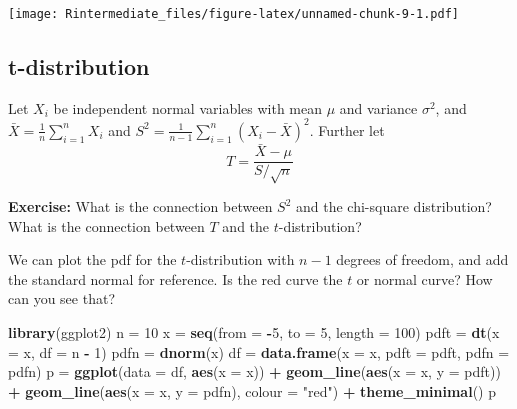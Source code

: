 \documentclass[]{article}
\newenvironment{Shaded}{\begin{snugshade}}{\end{snugshade}}
\newcommand{\KeywordTok}[1]{\textcolor[rgb]{0.13,0.29,0.53}{\textbf{#1}}}
\newcommand{\DataTypeTok}[1]{\textcolor[rgb]{0.13,0.29,0.53}{#1}}
\newcommand{\DecValTok}[1]{\textcolor[rgb]{0.00,0.00,0.81}{#1}}
\newcommand{\StringTok}[1]{\textcolor[rgb]{0.31,0.60,0.02}{#1}}
\newcommand{\OperatorTok}[1]{\textcolor[rgb]{0.81,0.36,0.00}{\textbf{#1}}}
\newcommand{\NormalTok}[1]{#1}
\begin{document}
\texttt{[image: Rintermediate\_files/figure-latex/unnamed-chunk-9-1.pdf]}

\subsection{t-distribution}\label{t-distribution}

Let \(X_i\) be independent normal variables with mean \(\mu\) and
variance \(\sigma^2\), and \(\bar{X}=\frac{1}{n}\sum_{i=1}^n X_i\) and
\(S^2=\frac{1}{n-1}\sum_{i=1}^n (X_i-\bar{X})^2\). Further let
\[ T=\frac{\bar{X}-\mu}{S/\sqrt{n}}\]

\textbf{Exercise:} What is the connection between \(S^2\) and the
chi-square distribution? What is the connection between \(T\) and the
\(t\)-distribution?

\begingroup\color{dg}

\endgroup

We can plot the pdf for the \(t\)-distribution with \(n-1\) degrees of
freedom, and add the standard normal for reference. Is the red curve the
\(t\) or normal curve? How can you see that?

\begin{Shaded}
\begin{Highlighting}[]
\KeywordTok{library}\NormalTok{(ggplot2)}
\NormalTok{n =}\StringTok{ }\DecValTok{10}
\NormalTok{x =}\StringTok{ }\KeywordTok{seq}\NormalTok{(}\DataTypeTok{from =} \OperatorTok{-}\DecValTok{5}\NormalTok{, }\DataTypeTok{to =} \DecValTok{5}\NormalTok{, }\DataTypeTok{length =} \DecValTok{100}\NormalTok{)}
\NormalTok{pdft =}\StringTok{ }\KeywordTok{dt}\NormalTok{(}\DataTypeTok{x =}\NormalTok{ x, }\DataTypeTok{df =}\NormalTok{ n }\OperatorTok{-}\StringTok{ }\DecValTok{1}\NormalTok{)}
\NormalTok{pdfn =}\StringTok{ }\KeywordTok{dnorm}\NormalTok{(x)}
\NormalTok{df =}\StringTok{ }\KeywordTok{data.frame}\NormalTok{(}\DataTypeTok{x =}\NormalTok{ x, }\DataTypeTok{pdft =}\NormalTok{ pdft, }\DataTypeTok{pdfn =}\NormalTok{ pdfn)}
\NormalTok{p =}\StringTok{ }\KeywordTok{ggplot}\NormalTok{(}\DataTypeTok{data =}\NormalTok{ df, }\KeywordTok{aes}\NormalTok{(}\DataTypeTok{x =}\NormalTok{ x)) }\OperatorTok{+}\StringTok{ }\KeywordTok{geom_line}\NormalTok{(}\KeywordTok{aes}\NormalTok{(}\DataTypeTok{x =}\NormalTok{ x, }\DataTypeTok{y =}\NormalTok{ pdft)) }\OperatorTok{+}\StringTok{ }
\StringTok{    }\KeywordTok{geom_line}\NormalTok{(}\KeywordTok{aes}\NormalTok{(}\DataTypeTok{x =}\NormalTok{ x, }\DataTypeTok{y =}\NormalTok{ pdfn), }\DataTypeTok{colour =} \StringTok{"red"}\NormalTok{) }\OperatorTok{+}\StringTok{ }\KeywordTok{theme_minimal}\NormalTok{()}
\NormalTok{p}
\end{Highlighting}
\end{Shaded}
\end{document}
